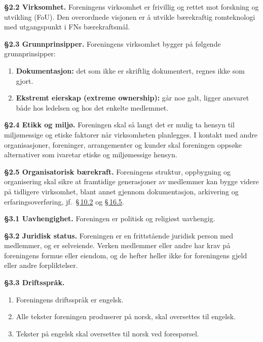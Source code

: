\documentclass{../../../Common/Latex/Templates/rapport}
\begin{document}
\textbf{\S 2.2 Virksomhet.}\label{nbylaw:2.2} Foreningens virksomhet er frivillig og rettet mot forskning og utvikling (FoU). Den overordnede visjonen er \r{a} utvikle bærekraftig romteknologi med utgangspunkt i FNs bærekraftsm\r{a}l.

\textbf{\S 2.3 Grunnprinsipper.}\label{nbylaw:2.3} Foreningens virksomhet bygger p\r{a} følgende grunnprinsipper:
\begin{enumerate}
  \item \textbf{Dokumentasjon:} det som ikke er skriftlig dokumentert, regnes ikke som gjort.
  \item \textbf{Ekstremt eierskap (extreme ownership):} g\r{a}r noe galt, ligger ansvaret b\r{a}de hos ledelsen og hos det enkelte medlemmet.
\end{enumerate}

\textbf{\S 2.4 Etikk og miljø.}\label{nbylaw:2.4} Foreningen skal s\r{a} langt det er mulig ta hensyn til miljømessige og etiske faktorer n\r{a}r virksomheten planlegges. I kontakt med andre organisasjoner, foreninger, arrangementer og kunder skal foreningen oppsøke alternativer som ivaretar etiske og miljømessige hensyn.

\textbf{\S 2.5 Organisatorisk bærekraft.}\label{nbylaw:2.5} Foreningens struktur, oppbygning og organisering skal sikre at framtidige generasjoner av medlemmer kan bygge videre p\r{a} tidligere virksomhet, blant annet gjennom dokumentasjon, arkivering og erfaringsoverføring, jf.\ \hyperref[nbylaw:10.2]{\S\,10.2} og \hyperref[nbylaw:16.5]{\S\,16.5}.

\label{nbylaw:3}
\textbf{\S 3.1 Uavhengighet.}\label{nbylaw:3.1} Foreningen er politisk og religiøst uavhengig.

\textbf{\S 3.2 Juridisk status.}\label{nbylaw:3.2} Foreningen er en frittst\r{a}ende juridisk person med medlemmer, og er selveiende. Verken medlemmer eller andre har krav p\r{a} foreningens formue eller eiendom, og de hefter heller ikke for foreningens gjeld eller andre forpliktelser.

\textbf{\S 3.3 Driftsspr\r{a}k.}\label{nbylaw:3.3}
\begin{enumerate}
  \item Foreningens driftsspr\r{a}k er engelsk.
  \item Alle tekster foreningen produserer p\r{a} norsk, skal oversettes til engelsk.
  \item Tekster p\r{a} engelsk skal oversettes til norsk ved forespørsel.
\end{enumerate}
\end{document}
